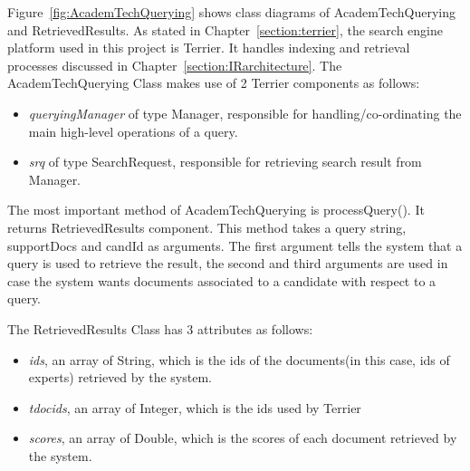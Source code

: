 Figure~\ref{fig:AcademTechQuerying} shows class diagrams of AcademTechQuerying and RetrievedResults. As stated in Chapter~\ref{section:terrier},
the search engine platform used in this project is Terrier. It handles indexing and retrieval processes discussed in Chapter~\ref{section:IRarchitecture}.
The AcademTechQuerying Class makes use of 2 Terrier components as follows:  
\begin{itemize}
 \item \textit{queryingManager} of type Manager, responsible for handling/co-ordinating the main high-level operations of a query.
 \item \textit{srq} of type SearchRequest, responsible for retrieving search result from Manager.
\end{itemize}
The most important method of AcademTechQuerying is processQuery(). It returns RetrievedResults component. This method takes a query string, supportDocs and candId as arguments. The first argument tells
the system that a query is used to retrieve the result, the second and third arguments are used in case the system wants documents associated to a candidate 
with respect to a query.

The RetrievedResults Class has 3 attributes as follows:
\begin{itemize}
 \item \textit{ids}, an array of String, which is the ids of the documents(in this case, ids of experts) retrieved by the system.
 \item \textit{tdocids}, an array of Integer, which is the ids used by Terrier
 \item \textit{scores}, an array of Double, which is the scores of each document retrieved by the system.
\end{itemize}

